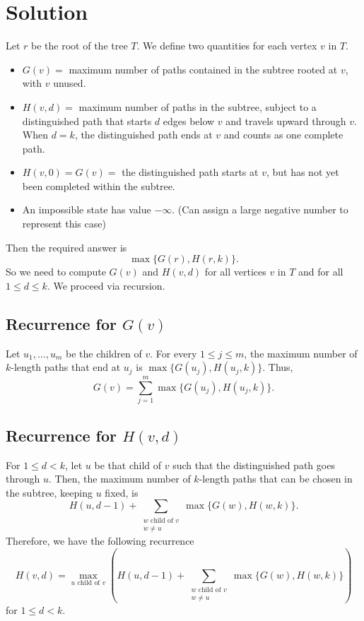 \documentclass[11pt]{scrartcl}
\theoremstyle{plain}
\theoremstyle{definition}
\theoremstyle{remark}
\begin{document}
\section{Solution}
Let $r$ be the root of the tree $T$. We define two quantities for each vertex $v$ in $T$.\\
\begin{itemize}
    \item $G(v)=$ maximum number of paths contained in the subtree rooted at \(v\), with \(v\) unused.
    \item $H(v,d)=$ maximum number of paths in the subtree, subject to a distinguished path that starts \(d\) edges below \(v\) and travels upward through \(v\). When \(d=k\), the distinguished path ends at \(v\) and counts as one complete path.
    \item $H(v,0)=G(v)=$ the distinguished path starts at $v$, but has not yet been completed within the subtree.
    \item An impossible state has value $-\infty$. (Can assign a large negative number to represent this case)
\end{itemize}Then the required answer is \[\max\{G(r), H(r, k)\}.\]
So we need to compute $G(v)$ and $H(v, d)$ for all vertices $v$ in $T$ and for all $1\leq d\leq k$. We proceed via recursion.

\subsection{Recurrence for $G(v)$}
Let $u_1, \ldots, u_m$ be the children of $v$. For every $1\leq j\leq m$, the maximum number of $k$-length paths that end at $u_j$ is $\max\{G(u_j), H(u_j, k)\}$. Thus, \[G(v) = \sum_{j=1}^m \max\{G(u_j), H(u_j, k)\}.\]

\subsection{Recurrence for $H(v, d)$}
For $1\leq d < k$, let $u$ be that child of $v$ such that the distinguished path goes through $u$. Then, the maximum number of $k$-length paths that can be chosen in the subtree, keeping $u$ fixed, is \[H(u, d-1) + \sum_{\substack{w \text{ child of } v\\ w\neq u}}\max\{G(w), H(w, k)\}.\]Therefore, we have the following recurrence \[H(v, d) = \max_{u \text{ child of } v} \left(H(u, d-1) + \sum_{\substack{w \text{ child of } v\\ w\neq u}}\max\{G(w), H(w, k)\}\right)\] for $1\leq d < k$.
\end{document}
